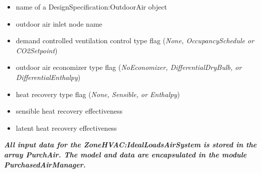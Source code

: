 \begin{itemize}
  \item name of a DesignSpecification:OutdoorAir object
  \item outdoor air inlet node name
  \item demand controlled ventilation control type flag (\emph{None, OccupancySchedule or CO2Setpoint})
  \item outdoor air economizer type flag (\emph{NoEconomizer, DifferentialDryBulb, or DifferentialEnthalpy})
  \item heat recovery type flag (\emph{None, Sensible, or Enthalpy})
  \item sensible heat recovery effectiveness
  \item latent heat recovery effectiveness
\end{itemize}

\emph{\textbf{All input data for the ZoneHVAC:IdealLoadsAirSystem is stored in the array PurchAir. The model and data are encapsulated in the module PurchasedAirManager.}}

